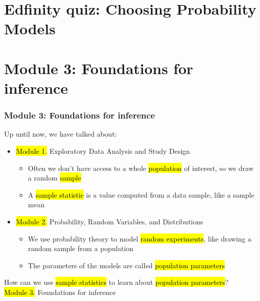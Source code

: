 \documentclass[t,compress,mathserif]{beamer}
\begin{document}

\section{Edfinity quiz: Choosing Probability Models}


\section{Module 3: Foundations for inference}


\begin{frame}
    \frametitle{Module 3: Foundations for inference}

    Up until now, we have talked about:
    \begin{itemize}
        \item \hl{Module 1. }Exploratory Data Analysis and Study Design
        \begin{itemize}
            \item Often we don't have access to a whole \hl{population} of interest, so we draw a random \hl{sample}
            \item A \hl{sample statistic} is a value computed from a data sample, like a sample mean
        \end{itemize}
        \pause
        \item \hl{Module 2. }Probability, Random Variables, and Distributions
        \begin{itemize}
            \item We use probability theory to model \hl{random experiments}, like drawing a random sample from a population
            \item The parameters of the models are called \hl{population parameters}
        \end{itemize}
    \end{itemize}
   
    \pause
    \begin{center}
        How can we use \hl{sample statistics} to learn about \hl{population parameters}?\\
        \hl{Module 3. }Foundations for inference
    \end{center}
\end{frame}

\end{document}
